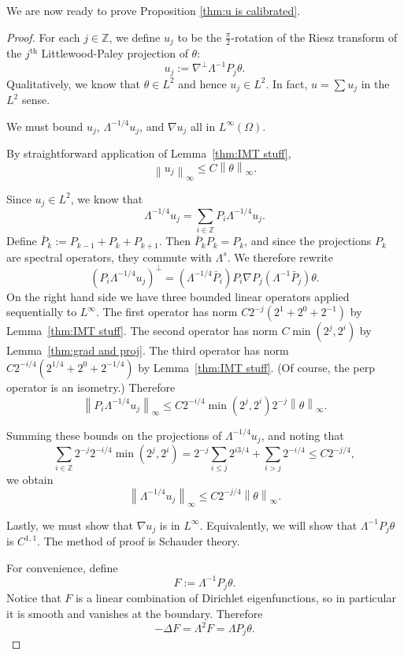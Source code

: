 \documentclass[11pt]{amsart}
\theoremstyle{remark}
\theoremstyle{definition}
\newcommand{\Z}{\mathbb{Z}}
\newcommand{\norm}[1]{\left\lVert#1\right\rVert}
\newcommand{\paren}[1]{\left( #1 \right)}
\newcommand{\grad}{\nabla}
\newcommand{\Laplace}{\Delta}
\newcommand{\ith}{^\mathrm{th}}
\begin{document}
We are now ready to prove Proposition \ref{thm:u is calibrated}.  

\begin{proof}
For each $j \in \Z$, we define $u_j$ to be the $\frac{\pi}{2}$-rotation of the Riesz transform of the $j\ith$ Littlewood-Paley projection of $\theta$:
\[ u_j := \grad^\perp \Lambda^{-1} P_j \theta. \]
Qualitatively, we know that $\theta \in L^2$ and hence $u_j \in L^2$.  In fact, $u = \sum u_j$ in the $L^2$ sense.  

We must bound $u_j$, $\Lambda^{-1/4} u_j$, and $\grad u_j$ all in $L^\infty(\Omega)$.  

By straightforward application of Lemma~\ref{thm:IMT stuff},
\begin{equation} \label{uj in Linfty} \norm{u_j}_\infty \leq C \norm{\theta}_\infty. \end{equation}

Since $u_j \in L^2$, we know that
\[ \Lambda^{-1/4} u_j = \sum_{i \in \Z} P_i \Lambda^{-1/4} u_j. \]
Define $\bar{P}_k := P_{k-1} + P_k + P_{k+1}$.  Then $\bar{P}_k P_k = P_k$, and since the projections $P_k$ are spectral operators, they commute with $\Lambda^s$.  We therefore rewrite
\[ \paren{P_i \Lambda^{-1/4} u_j}^\perp = \paren{\Lambda^{-1/4} \bar{P}_i} P_i \grad P_j \paren{\Lambda^{-1} \bar{P}_j} \theta. \]
On the right hand side we have three bounded linear operators applied sequentially to $L^\infty$.  The first operator has norm $C 2^{-j}(2^{1}+2^0+2^{-1})$ by Lemma~\ref{thm:IMT stuff}.  The second operator has norm $C \min(2^j, 2^i)$ by Lemma~\ref{thm:grad and proj}.  The third operator has norm $C 2^{-i/4}(2^{1/4} + 2^0 + 2^{-1/4})$ by Lemma~\ref{thm:IMT stuff}.  (Of course, the perp operator is an isometry.)  Therefore
\[ \norm{ P_i \Lambda^{-1/4} u_j}_\infty \leq C 2^{-i/4} \min(2^j, 2^i) 2^{-j} \norm{\theta}_\infty. \]

Summing these bounds on the projections of $\Lambda^{-1/4} u_j$, and noting that
\[ \sum_{i \in \Z} 2^{-j} 2^{-i/4} \min(2^j,2^i) = 2^{-j} \sum_{i \leq j} 2^{i 3/4} + \sum_{i>j} 2^{-i/4} \leq C 2^{-j/4}, \]
we obtain
\begin{equation}\label{uj in W-1/4} \norm{\Lambda^{-1/4} u_j}_\infty \leq C 2^{-j/4} \norm{\theta}_\infty. \end{equation}

Lastly, we must show that $\grad u_j$ is in $L^\infty$.  Equivalently, we will show that $\Lambda^{-1} P_j \theta$ is $C^{1,1}$.  The method of proof is Schauder theory.  

For convenience, define
\[ F := \Lambda^{-1} P_j \theta. \]
Notice that $F$ is a linear combination of Dirichlet eigenfunctions, so in particular it is smooth and vanishes at the boundary.  Therefore
\[ -\Laplace F = \Lambda^2 F = \Lambda P_j \theta. \]



\end{proof}
\end{document}
